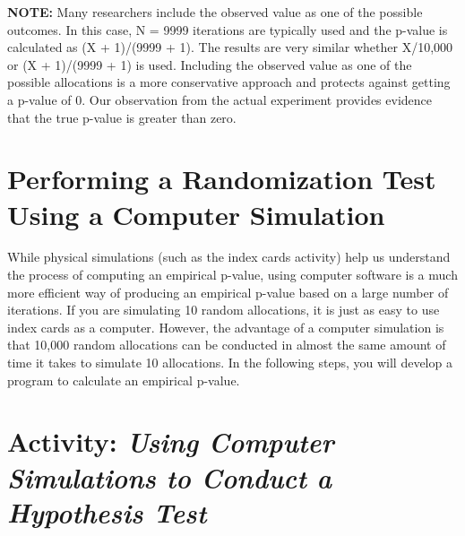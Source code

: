 \documentclass[
]{report}
\theoremstyle{definition}
\theoremstyle{definition}
\theoremstyle{definition}
\theoremstyle{definition}
\theoremstyle{remark}
\begin{document}
\large

\textbf{NOTE:}
Many researchers include the observed value as one of the possible outcomes. In this case, N = 9999
iterations are typically used and the p-value is calculated as (X + 1)/(9999 + 1). The results are very
similar whether X/10,000 or (X + 1)/(9999 + 1) is used. Including the observed value as one of the
possible allocations is a more conservative approach and protects against getting a p-value of 0. Our
observation from the actual experiment provides evidence that the true p-value is greater than zero.

\hypertarget{performing-a-randomization-test-using-a-computer-simulation}{%
\section{\texorpdfstring{\textbf{Performing a Randomization Test Using a Computer Simulation}}{Performing a Randomization Test Using a Computer Simulation}}\label{performing-a-randomization-test-using-a-computer-simulation}}

\normalsize

While physical simulations (such as the index cards activity) help us understand the process of computing an
empirical p-value, using computer software is a much more efficient way of producing an empirical p-value
based on a large number of iterations. If you are simulating 10 random allocations, it is just as easy to use index cards as a computer. However, the advantage of a computer simulation is that 10,000 random allocations
can be conducted in almost the same amount of time it takes to simulate 10 allocations. In the following
steps, you will develop a program to calculate an empirical p-value.

\hypertarget{activity-using-computer-simulations-to-conduct-a-hypothesis-test}{%
\section*{\texorpdfstring{Activity: \emph{Using Computer Simulations to Conduct a Hypothesis Test}}{Activity: Using Computer Simulations to Conduct a Hypothesis Test}}\label{activity-using-computer-simulations-to-conduct-a-hypothesis-test}}
\end{document}
